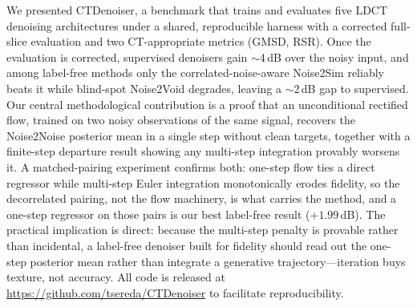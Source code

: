 \documentclass[letterpaper]{article} %
\begin{document}
We presented CTDenoiser, a benchmark that trains and evaluates five LDCT
denoising architectures under a shared, reproducible harness with a
corrected full-slice evaluation and two CT-appropriate metrics (GMSD,
RSR).  Once the evaluation is corrected, supervised denoisers gain
$\sim$4\,dB over the noisy input, and among label-free methods only the
correlated-noise-aware Noise2Sim reliably beats it while blind-spot
Noise2Void degrades, leaving a $\sim$2\,dB gap to supervised.  Our central
methodological contribution is a proof that an unconditional rectified
flow, trained on two noisy observations of the same signal, recovers the
Noise2Noise posterior mean in a single step without clean targets, together with
a finite-step departure result showing any multi-step integration provably
worsens it.  A matched-pairing experiment confirms both: one-step flow ties a
direct regressor while multi-step Euler integration monotonically erodes
fidelity, so the decorrelated pairing, not the flow machinery, is what
carries the method, and a one-step regressor on those pairs is our best label-free
result ($+1.99$\,dB).  The practical implication is direct: because the multi-step
penalty is provable rather than incidental, a label-free denoiser built for
fidelity should read out the one-step posterior mean rather than integrate a
generative trajectory---iteration buys texture, not accuracy.  All code is released
at \url{https://github.com/tsereda/CTDenoiser} to facilitate reproducibility.
\end{document}
